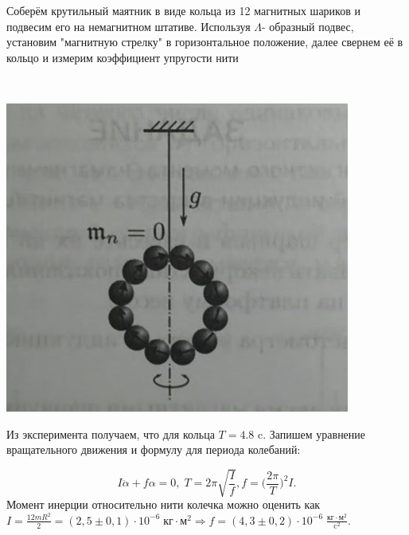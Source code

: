 \documentclass[a4paper,12pt]{article}
\begin{document}
\begin{minipage}{0.3\textwidth}
Соберём крутильный маятник в виде кольца из 12 магнитных шариков и подвесим его на немагнитном штативе. Используя $\Lambda$- образный подвес, установим "магнитную стрелку" в горизонтальное положение, далее свернем её в кольцо и измерим коэффициент упругости нити

\end{minipage}
\begin{minipage}{0.05\textwidth}
\
\end{minipage}
\begin{minipage}{0.3\textwidth}
\begin{center}
\includegraphics[width=\linewidth]{5.jpg}\\
\end{center}

\end{minipage}
Из эксперимента получаем, что для кольца $T = 4.8$ c. Запишем уравнение вращательного движения и формулу для периода колебаний:

 $$I \ddot \alpha + f\alpha = 0, \; T = 2\pi \sqrt{\frac{I}{f}}, f = \Big(\frac{2\pi}{T}\Big)^2 I.$$
 Момент инерции относительно нити колечка можно оценить как $I = \frac{12mR^2}{2} = (2,5 \pm 0,1) \cdot 10^{-6} \; {\text{кг} \cdot \text{м}^2} \Rightarrow f =  (4,3 \pm 0,2) \cdot 10^{-6} \; \frac{\text{кг} \cdot \text{м}^2}{\text{c}^2}$.

 \newpage
\end{document}

